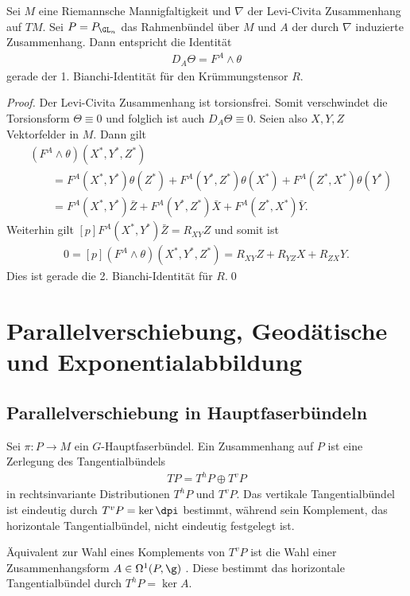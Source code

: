 \documentclass[%
	paper=a5,%
	fleqn,%
	DIV=18,%
	BCOR=0mm,
	fontsize=11pt,
	titlepage=false,%
	bibliography=totoc,
	DIV=18,%
	twoside=true,
	pdftitle=Riemannsche Geometrie,
	pdfauthor=Uwe Semmelmann,
	numbers=noendperiod]%
	{scrbook}
\begin{document}
\begin{lem}
Sei $M$ eine Riemannsche Mannigfaltigkeit und $\nabla$ der Levi-Civita
Zusammenhang auf $TM$. Sei $P=P_{\GL_n}$ das Rahmenbündel über $M$ und $A$ der
durch $\nabla$ induzierte Zusammenhang. Dann entspricht die Identität
\begin{align*}
D_A \Theta = F^A \wedge \theta
\end{align*}
gerade der 1. Bianchi-Identität für den Krümmungstensor $R$.\fish
\end{lem}
\begin{proof}
Der Levi-Civita Zusammenhang ist torsionsfrei. Somit verschwindet die
Torsionsform $\Theta \equiv 0$ und folglich ist auch $D_A \Theta \equiv 0$.
Seien also $X,Y,Z$ Vektorfelder in $M$. Dann gilt
\begin{align*}
&(F^A\wedge \theta)(X^*,Y^*,Z^*) \\
&\qquad=
F^A(X^*,Y^*)\theta(Z^*) + 
F^A(Y^*,Z^*)\theta(X^*) + 
F^A(Z^*,X^*)\theta(Y^*)\\
&\qquad =  
F^A(X^*,Y^*)\bar{Z} + 
F^A(Y^*,Z^*)\bar{X} + 
F^A(Z^*,X^*)\bar{Y}.
\end{align*}
Weiterhin gilt $[p]F^A(X^*,Y^*)\bar{Z} = R_{XY}Z$ und somit ist
\begin{align*}
0 =  [p](F^A\wedge \theta)(X^*,Y^*,Z^*) = 
R_{XY}Z
 + R_{YZ}X + R_{ZX}Y.
\end{align*}
Dies ist gerade die 2. Bianchi-Identität für $R$.\qed
\end{proof}


\chapter{Parallelverschiebung, Geodätische und Exponentialabbildung}

\section{Parallelverschiebung in Hauptfaserbündeln}

Sei $\pi: P\to M$ ein $G$-Hauptfaserbündel. Ein Zusammenhang auf $P$ ist eine Zerlegung des Tangentialbündels
\begin{align*}
TP = T^hP\oplus T^vP
\end{align*}
in rechtsinvariante Distributionen $T^hP$ und $T^vP$. Das vertikale Tangentialbündel ist eindeutig durch $T^vP=\ker \dpi$ bestimmt, während sein Komplement, das horizontale Tangentialbündel, nicht eindeutig festgelegt ist.

Äquivalent zur Wahl eines Komplements von $T^vP$ ist die Wahl einer Zusammenhangsform $A\in\Omega^1(P,\g)$ . Diese bestimmt das horizontale Tangentialbündel durch $T^hP=\ker A$.
\end{document}
